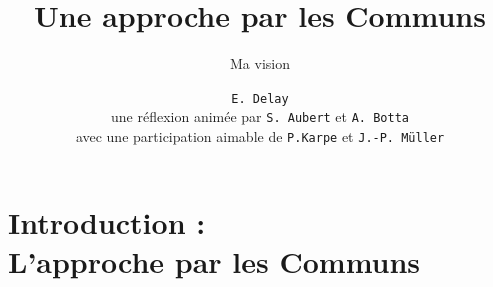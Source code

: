 \documentclass[newPxFont]{beamer}
\title{Une approche par les Communs}
\subtitle{Ma vision}
\author{\texttt{E. Delay}\\
 une réflexion animée par \texttt{S. Aubert} et \texttt{A. Botta}\\
 avec une participation aimable de \texttt{P.Karpe} et \texttt{J.-P. Müller}}
\institute{CIRAD -- UMR SENS}
\begin{document}
%
%


\maketitle


%
%


\section{Introduction :\\ L'approche par les Communs}
\end{document}
